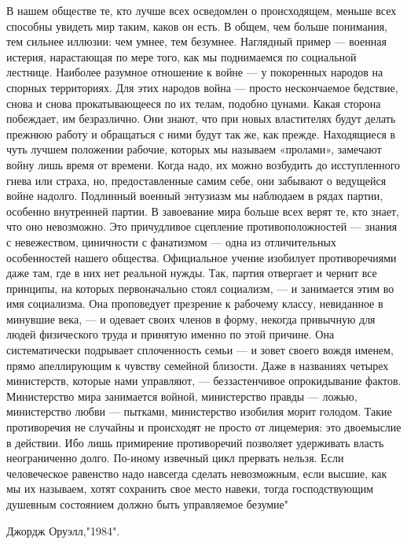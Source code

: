 В нашем обществе те, кто лучше всех осведомлен о происходящем, меньше всех
способны увидеть мир таким, каков он есть. В общем, чем больше понимания, тем
сильнее иллюзии: чем умнее, тем безумнее. Наглядный пример — военная истерия,
нарастающая по мере того, как мы поднимаемся по социальной лестнице. Наиболее
разумное отношение к войне — у покоренных народов на спорных территориях. Для
этих народов война — просто нескончаемое бедствие, снова и снова
прокатывающееся по их телам, подобно цунами. Какая сторона побеждает, им
безразлично. Они знают, что при новых властителях будут делать прежнюю работу и
обращаться с ними будут так же, как прежде. Находящиеся в чуть лучшем положении
рабочие, которых мы называем «пролами», замечают войну лишь время от времени.
Когда надо, их можно возбудить до исступленного гнева или страха, но,
предоставленные самим себе, они забывают о ведущейся войне надолго. Подлинный
военный энтузиазм мы наблюдаем в рядах партии, особенно внутренней партии. В
завоевание мира больше всех верят те, кто знает, что оно невозможно. Это
причудливое сцепление противоположностей — знания с невежеством, циничности с
фанатизмом — одна из отличительных особенностей нашего общества. Официальное
учение изобилует противоречиями даже там, где в них нет реальной нужды. Так,
партия отвергает и чернит все принципы, на которых первоначально стоял
социализм, — и занимается этим во имя социализма. Она проповедует презрение к
рабочему классу, невиданное в минувшие века, — и одевает своих членов в форму,
некогда привычную для людей физического труда и принятую именно по этой
причине. Она систематически подрывает сплоченность семьи — и зовет своего вождя
именем, прямо апеллирующим к чувству семейной близости. Даже в названиях
четырех министерств, которые нами управляют, — беззастенчивое опрокидывание
фактов. Министерство мира занимается войной, министерство правды — ложью,
министерство любви — пытками, министерство изобилия морит голодом. Такие
противоречия не случайны и происходят не просто от лицемерия: это двоемыслие в
действии. Ибо лишь примирение противоречий позволяет удерживать власть
неограниченно долго. По-иному извечный цикл прервать нельзя. Если человеческое
равенство надо навсегда сделать невозможным, если высшие, как мы их называем,
хотят сохранить свое место навеки, тогда господствующим душевным состоянием
должно быть управляемое безумие"

Джордж Оруэлл,"1984".
